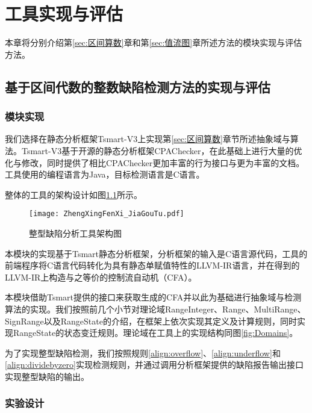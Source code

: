 
\chapter{工具实现与评估}
\label{sec:实验与评估}

本章将分别介绍第\ref{sec:区间算数}章和第\ref{sec:值流图}章所述方法的模块实现与评估方法。

\section{基于区间代数的整数缺陷检测方法的实现与评估}
\label{sec:区间算数评估与结果}

\subsection{模块实现} 
\label{sec:区间算数模块实现}

我们选择在静态分析框架Tsmart-V3上实现第\ref{sec:区间算数}章节所述抽象域与算法。Tsmart-V3基于开源的静态分析框架CPAChecker，在此基础上进行大量的优化与修改，同时提供了相比CPAChecker更加丰富的行为接口与更为丰富的文档。工具使用的编程语言为Java，目标检测语言是C语言。

整体的工具的架构设计如图\ref{fig:整型分析架构图}所示。

\begin{figure}[H]
	\centering
	\texttt{[image: ZhengXingFenXi\_JiaGouTu.pdf]}
	\caption{整型缺陷分析工具架构图}
	\label{fig:整型分析架构图}
\end{figure}

本模块的实现基于Tsmart静态分析框架，分析框架的输入是C语言源代码，工具的前端程序将C语言代码转化为具有静态单赋值特性的LLVM-IR语言，并在得到的LLVM-IR上构造与之等价的控制流自动机（CFA）。

本模块借助Tsmart提供的接口来获取生成的CFA并以此为基础进行抽象域与检测算法的实现。我们按照前几个小节对理论域RangeInteger、Range、MultiRange、SignRange以及RangeState的介绍，在框架上依次实现其定义及计算规则，同时实现RangeState的状态变迁规则。理论域在工具上的实现结构同图\ref{fig:Domains}。

为了实现整型缺陷检测，我们按照规则\ref{align:overflow}、\ref{align:underflow}和\ref{align:dividebyzero}实现检测规则，并通过调用分析框架提供的缺陷报告输出接口实现整型缺陷的输出。

\subsection{实验设计}


